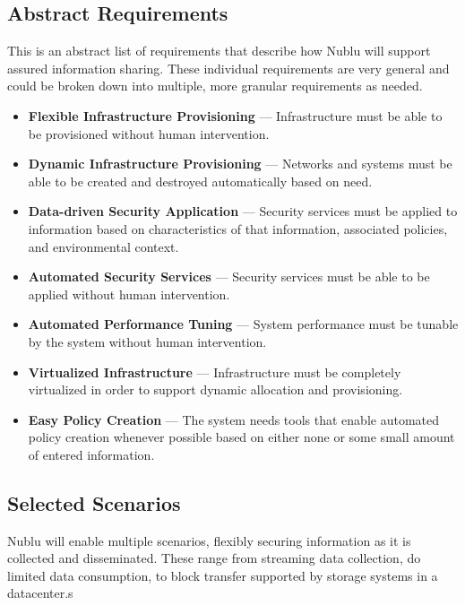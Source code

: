 \documentclass[12pt,letterpaper]{article}
\begin{document}
\subsection{Abstract Requirements}
\label{sec:requirements}
This is an abstract list of requirements that describe how Nublu will support assured information sharing.  These individual requirements are very general and could be broken down into multiple, more granular requirements as needed.
\begin{itemize}
\item {\bf Flexible Infrastructure Provisioning} --- Infrastructure must be able to be provisioned without human intervention.

\item {\bf Dynamic Infrastructure Provisioning} --- Networks and systems must be able to be created and destroyed automatically based on need.

\item {\bf Data-driven Security Application} --- Security services must be applied to information based on characteristics of that information, associated policies, and environmental context.

\item {\bf Automated Security Services} --- Security services must be able to be applied without human intervention.

\item {\bf Automated Performance Tuning} --- System performance must be tunable by the system without human intervention.

\item {\bf Virtualized Infrastructure} --- Infrastructure must be completely virtualized in order to support dynamic allocation and provisioning.

\item {\bf Easy Policy Creation} --- The system needs tools that enable automated policy creation whenever possible based on either none or some small amount of entered information.
\end{itemize}

\subsection{Selected Scenarios}
\label{sec:scenarios}
Nublu will enable multiple scenarios, flexibly securing information as it is collected and disseminated.  These range from streaming data collection, do limited data consumption, to block transfer supported by storage systems in a datacenter.s
\end{document}
